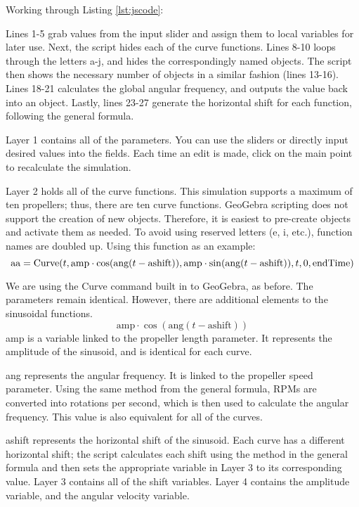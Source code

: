 Working through Listing \ref{lst:jscode}:

Lines 1-5 grab values from the input slider and assign them to local variables for later use. Next, the script hides each of the curve functions. Lines 8-10 loops through the letters a-j, and hides the correspondingly named objects. The script then shows the necessary number of objects in a similar fashion (lines 13-16). Lines 18-21 calculates the global angular frequency, and outputs the value back into an object. Lastly, lines 23-27 generate the horizontal shift for each function, following the general formula.

Layer 1 contains all of the parameters. You can use the sliders or directly input desired values into the fields. Each time an edit is made, click on the main point to recalculate the simulation.

Layer 2 holds all of the curve functions. This simulation supports a maximum of ten propellers; thus, there are ten curve functions. GeoGebra scripting does not support the creation of new objects. Therefore, it is easiest to pre-create objects and activate them as needed. To avoid using reserved letters (e, i, etc.), function names are doubled up. Using this function as an example:
\[\mbox{aa}=\mbox{Curve}(t, \mbox{amp}\cdot\cos(\mbox{ang}(t-\mbox{ashift})), \\ \mbox{amp}\cdot\sin(\mbox{ang}(t-\mbox{ashift})), t, 0, \mbox{endTime})\]

We are using the Curve command built in to GeoGebra, as before. The parameters remain identical. However, there are additional elements to the sinusoidal functions.
\[\mbox{amp}\cdot\cos(\mbox{ang}(t-\mbox{ashift}))\]
amp is a variable linked to the propeller length parameter. It represents the amplitude of the sinusoid, and is identical for each curve.

ang represents the angular frequency. It is linked to the propeller speed parameter. Using the same method from the general formula, RPMs are converted into rotations per second, which is then used to calculate the angular frequency. This value is also equivalent for all of the curves.

ashift represents the horizontal shift of the sinusoid. Each curve has a different horizontal shift; the script calculates each shift using the method in the general formula and then sets the appropriate variable in Layer 3 to its corresponding value. Layer 3 contains all of the shift variables. Layer 4 contains the amplitude variable, and the angular velocity variable.

